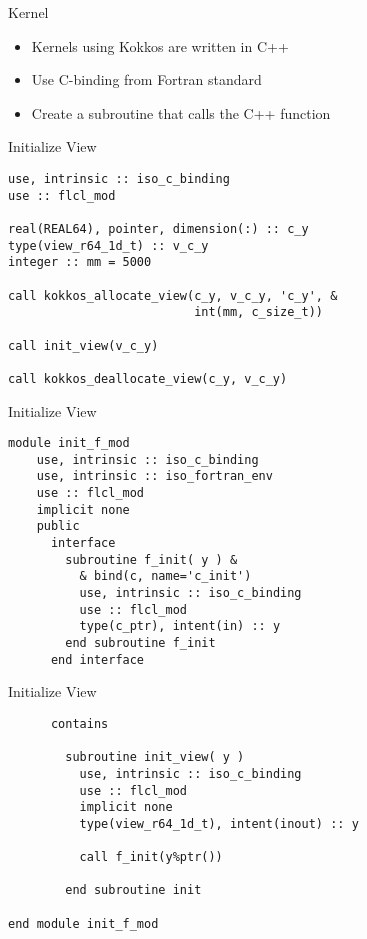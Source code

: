 \begin{frame}{Kernel}
  \begin{itemize}
    \item Kernels using Kokkos are written in C++
    \item Use C-binding from Fortran standard 
    \item Create a subroutine that calls the C++ function
  \end{itemize}
\end{frame}

\begin{frame}[containsverbatim]{Initialize View}
  \begin{verbatim}
use, intrinsic :: iso_c_binding
use :: flcl_mod

real(REAL64), pointer, dimension(:) :: c_y
type(view_r64_1d_t) :: v_c_y
integer :: mm = 5000

call kokkos_allocate_view(c_y, v_c_y, 'c_y', &
                          int(mm, c_size_t))

call init_view(v_c_y)

call kokkos_deallocate_view(c_y, v_c_y)
  \end{verbatim}
\end{frame}

\begin{frame}[containsverbatim]{Initialize View}
  \begin{verbatim}
module init_f_mod
    use, intrinsic :: iso_c_binding
    use, intrinsic :: iso_fortran_env
    use :: flcl_mod
    implicit none
    public
      interface
        subroutine f_init( y ) &
          & bind(c, name='c_init')
          use, intrinsic :: iso_c_binding
          use :: flcl_mod
          type(c_ptr), intent(in) :: y
        end subroutine f_init
      end interface
  \end{verbatim}
\end{frame}

\begin{frame}[containsverbatim]{Initialize View}
  \begin{verbatim}
      contains

        subroutine init_view( y )
          use, intrinsic :: iso_c_binding
          use :: flcl_mod
          implicit none
          type(view_r64_1d_t), intent(inout) :: y

          call f_init(y%ptr())

        end subroutine init
  
end module init_f_mod
  \end{verbatim}
\end{frame}

